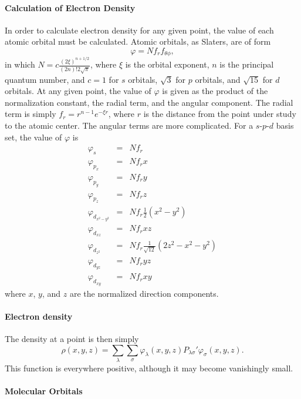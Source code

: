 \paragraph*{Calculation of Electron Density}
In order to calculate electron density for any given point, the value of
each atomic orbital must be calculated.  Atomic orbitals, as Slaters, are
of form
$$
\varphi = Nf_rf_{\theta\phi},
$$
in which $N=c\frac{(2\xi)^{n+1/2}}{(2n)!2\sqrt{\pi}}$, where $\xi$ is the orbital
exponent, $n$ is the principal quantum number, and $c=1$ for $s$ orbitals,
$\sqrt{3}$ for $p$ orbitals, and $\sqrt{15}$ for $d$ orbitals.
At any given point, the value of $\varphi$ is given as the product of the
normalization constant, the radial term, and the angular component.  The
radial term is simply $f_r=r^{n-1}e^{-\xi r}$, where $r$ is the distance
from the point under study to the atomic center.
The angular terms are more complicated.  For a $s$-$p$-$d$ basis set, the
value of $\varphi$ is
\begin{eqnarray}
\varphi       _s          &=& Nf_r \nonumber  \\
\varphi       _{p_x}       &=& Nf_rx \nonumber  \\
\varphi       _{p_y}       &=& Nf_ry \nonumber  \\
\varphi       _{p_z}       &=& Nf_rz\nonumber  \\
\varphi       _{d_{x^2-y^2}}&=& Nf_r\frac{1}{2}(x^2-y^2)\nonumber  \\
\varphi       _{d_{xz}}     &=& Nf_rxz \nonumber \\
\varphi       _{d_{z^2}   } &=& Nf_r\frac{1}{\sqrt{12}}(2z^2-x^2-y^2)\nonumber  \\
\varphi       _{d_{yz }   } &=& Nf_ryz         \nonumber   \\
\varphi       _{d_{xy }   } &=& Nf_rxy         \nonumber
\end{eqnarray}
where $x$, $y$, and $z$ are the normalized direction components.
\paragraph*{Electron density}

The density at a point is then simply
$$
\rho(x,y,z) = \sum_{\lambda}\sum_{\sigma}
\varphi_{\lambda}(x,y,z)P_{\lambda\sigma}'\varphi_{\sigma}(x,y,z).
$$
This function is everywhere positive, although it may become vanishingly small.
\paragraph*{Molecular Orbitals}

